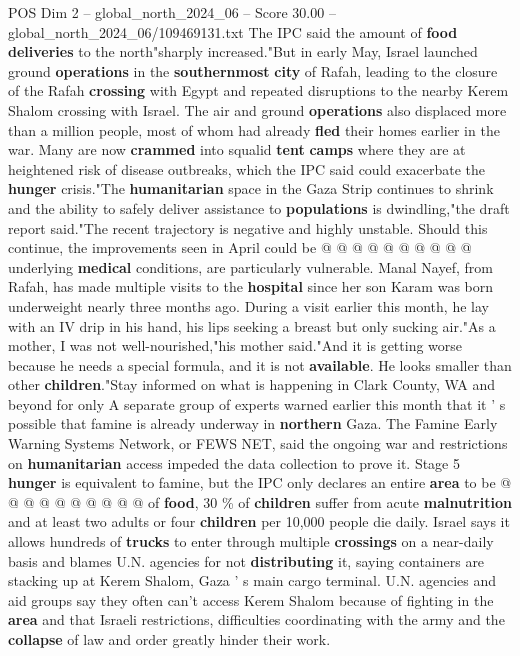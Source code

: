 \begin{textsample}{POS Dim 2 – global\_north\_2024\_06 – Score 30.00 – global\_north\_2024\_06/109469131.txt}
The IPC said the amount of \textbf{food} \textbf{deliveries} to the north"sharply increased."But in early May, Israel launched ground \textbf{operations} in the \textbf{southernmost} \textbf{city} of Rafah, leading to the closure of the Rafah \textbf{crossing} with Egypt and repeated disruptions to the nearby Kerem Shalom crossing with Israel.
The air and ground \textbf{operations} also displaced more than a million people, most of whom had already \textbf{fled} their homes earlier in the war.
Many are now \textbf{crammed} into squalid \textbf{tent} \textbf{camps} where they are at heightened risk of disease outbreaks, which the IPC said could exacerbate the \textbf{hunger} crisis."The \textbf{humanitarian} space in the Gaza Strip continues to shrink and the ability to safely deliver assistance to \textbf{populations} is dwindling,"the draft report said."The recent trajectory is negative and highly unstable.
Should this continue, the improvements seen in April could be @ @ @ @ @ @ @ @ @ @ underlying \textbf{medical} conditions, are particularly vulnerable.
Manal Nayef, from Rafah, has made multiple visits to the \textbf{hospital} since her son Karam was born underweight nearly three months ago.
During a visit earlier this month, he lay with an IV drip in his hand, his lips seeking a breast but only sucking air."As a mother, I was not well-nourished,"his mother said."And it is getting worse because he needs a special formula, and it is not \textbf{available}.
He looks smaller than other \textbf{children}."Stay informed on what is happening in Clark County, WA and beyond for only A separate group of experts warned earlier this month that it ' s possible that famine is already underway in \textbf{northern} Gaza.
The Famine Early Warning Systems Network, or FEWS NET, said the ongoing war and restrictions on \textbf{humanitarian} access impeded the data collection to prove it.
Stage 5 \textbf{hunger} is equivalent to famine, but the IPC only declares an entire \textbf{area} to be @ @ @ @ @ @ @ @ @ @ of \textbf{food}, 30 \% of \textbf{children} suffer from acute \textbf{malnutrition} and at least two adults or four \textbf{children} per 10,000 people die daily.
Israel says it allows hundreds of \textbf{trucks} to enter through multiple \textbf{crossings} on a near-daily basis and blames U.N. agencies for not \textbf{distributing} it, saying containers are stacking up at Kerem Shalom, Gaza ' s main cargo terminal.
U.N. agencies and aid groups say they often can't access Kerem Shalom because of fighting in the \textbf{area} and that Israeli restrictions, difficulties coordinating with the army and the \textbf{collapse} of law and order greatly hinder their work.

\end{textsample}
